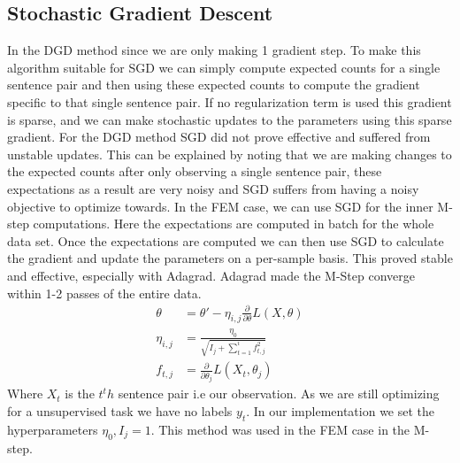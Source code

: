 \documentclass[11pt,letterpaper]{article}
\begin{document}
\subsection*{Stochastic Gradient Descent}
In the DGD method since we are only making 1 gradient step. To make this algorithm suitable for SGD we can simply compute expected counts for a single sentence pair and then using these expected counts to compute the gradient specific to that single sentence pair. If no regularization term is used this gradient is sparse, and we can make stochastic updates to the parameters using this sparse gradient. For the DGD method SGD did not prove effective and suffered from unstable updates. This can be explained by noting that we are making changes to the expected counts after only observing a single sentence pair, these expectations as a result are very noisy and SGD suffers from having a noisy objective to optimize towards. In the FEM case, we can use SGD for the inner M-step computations. Here the expectations are computed in batch for the whole data set. Once the expectations are computed we can then use SGD to calculate the gradient and update the parameters on a per-sample basis. This proved stable and effective, especially with Adagrad. Adagrad made the M-Step converge within 1-2 passes of the entire data.
\begin{align*}
\theta &= \theta' - \eta_{i,j}\frac{\partial}{\partial \theta} L(X,\theta)\\  
\eta_{i,j} &= \frac{\eta_0}{\sqrt{I_j + \sum_{t=1}^i f_{t,j}^2}}\\
f_{t,j} &= \frac{\partial}{\partial \theta_j} L(X_t,\theta_j)
\end{align*}
Where $X_t$ is the $t^th$ sentence pair i.e our observation. As we are still optimizing for a unsupervised task we have no labels $y_t$. In our implementation we set the hyperparameters $\eta_0, I_j = 1$. This method was used in the FEM case in the M-step.
\end{document}
